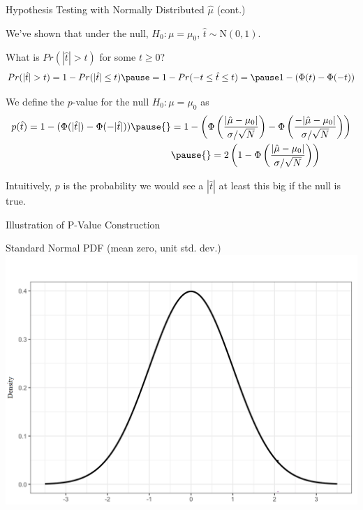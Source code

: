 \documentclass[11pt,english,handout]{beamer}
\newenvironment{wideitemize}{\itemize\addtolength{\itemsep}{10pt}}{\enditemize}
\begin{document}
\begin{frame}{Hypothesis Testing with Normally Distributed $\hat\mu$ (cont.)}
\begin{wideitemize}
\item
We've shown that under the null, $H_0:\mu=\mu_0$, $\hat{t} \sim \mathrm{N}(0,1)$.

\pause
\item What is $Pr( |\hat{t}| > t )$ for some $t \geq 0$? \pause
$$ Pr( |\hat{t}| > t ) = 1 - Pr(|\hat{t}| \leq t) \pause = 1 - Pr(  -t \leq \hat{t} \leq t  ) = \pause 1 - (\Phi(t) - \Phi(-t))$$ 
\vspace{-0.8cm}
\item
We define the $p$-value for the null $H_0: \mu = \mu_0$ as 
\begin{align*}
 p(\hat{t}) = 1 - (\Phi( |\hat{t} | ) - \Phi(- |\hat{t} |  )  ) \pause{} &= 1-  \left(  \Phi \left(  \frac{|\hat\mu - \mu_0|}{\sigma / \sqrt{N}} \right)  -  \Phi \left(  \frac{-|\hat\mu - \mu_0|}{\sigma / \sqrt{N}} \right) \right) 	\\
 &\pause{}= 2\left(1 -  \Phi \left(  \frac{|\hat\mu - \mu_0|}{\sigma / \sqrt{N}} \right)  \right) 
\end{align*}

 
\item
Intuitively, $p$ is the probability we would see a $|\hat{t}|$ at least this big if the null is true.

\end{wideitemize}	
\end{frame}

\begin{frame}{Illustration of P-Value Construction}
	
	
	\begin{center}
		Standard Normal PDF (mean zero, unit std. dev.)
		\includegraphics[scale=0.3]{pvalue1.png}
	\end{center}
	
\end{frame}
\end{document}
